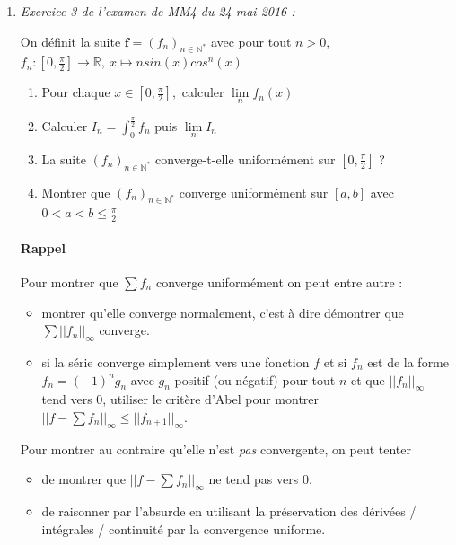 \documentclass[]{article}
\begin{document}
\begin{enumerate}
\item \textit{Exercice 3 de l'examen de MM4 du 24 mai 2016 :}

On définit la suite $\textbf{f}=(f_n)_{n \in \mathbb{N}^*}$ avec pour tout $n > 0$, $f_n : [0, \frac{\pi}{2}] \longrightarrow \mathbb{R}, ~ x \longmapsto n sin(x) cos^n(x)$

\begin{enumerate}
	\item Pour chaque $x \in [0, \frac{\pi}{2}],$ calculer $\displaystyle \lim\limits_{n} f_n(x)$
	\item Calculer $\displaystyle I_n=\int_0^{\frac{\pi}{2}}f_n$ puis $\lim\limits_{n} I_n$
	\item La suite $(f_n)_{n \in \mathbb{N}^*}$ converge-t-elle uniformément sur $[0, \frac{\pi}{2}]$ ?
	\item Montrer que $(f_n)_{n \in \mathbb{N}^*}$ converge uniformément sur $[a,b]$ avec $0 < a < b \leqslant \frac{\pi}{2}$
\end{enumerate}

\paragraph{Rappel} Pour montrer que $\displaystyle \sum f_n$ converge uniformément on peut entre autre :
\begin{itemize}
	\item montrer qu'elle converge normalement, c'est à dire démontrer que $\displaystyle \sum ||f_n||_{\infty}$ converge.
	
	\item si la série converge simplement vers une fonction $f$ et si $f_n$ est de la forme $f_n=(-1)^n g_n$ avec $g_n$ positif (ou négatif) pour tout $n$ et que $||f_n||_{\infty}$ tend vers 0, utiliser le critère d'Abel pour montrer $\displaystyle \left|\left| f-\sum f_n\right|\right|_{\infty} \leqslant ||f_{n+1}||_{\infty}$.
\end{itemize}

Pour montrer au contraire qu'elle n'est \textit{pas} convergente, on peut tenter
\begin{itemize}
	\item de montrer que $\displaystyle ||f-\sum f_n||_{\infty}$ ne tend pas vers $0$.
	
	\item de raisonner par l'absurde en utilisant la préservation des dérivées / intégrales / continuité par la convergence uniforme.
\end{itemize}


\end{enumerate}
\end{document}
